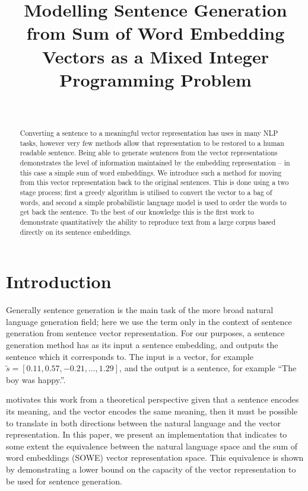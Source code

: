 \documentclass[compsoc]{IEEEtran}
\title{Modelling Sentence Generation from Sum of Word Embedding Vectors as a Mixed Integer Programming Problem}
\author{\IEEEauthorblockN{Lyndon White, Roberto Togneri, Wei Liu \and Mohammed Bennamoun}\\
	\IEEEauthorblockA{The University of Western Australia\\
		35 Stirling Highway, Crawley, Western Australia\\
		\texttt{lyndon.white@research.uwa.edu.au}\\
		\texttt{\{roberto.togneri, wei.liu, mohammed.bennamoun\}@uwa.edu.au}
		}
	}
\theoremstyle{plain}
\theoremstyle{definition}
\begin{document}
\maketitle

\begin{abstract}

	
Converting a sentence to a meaningful vector representation has uses in many NLP tasks, however very few methods allow that representation to be restored to a human readable sentence. Being able to generate sentences from the vector representations demonstrates the level of information maintained by the embedding representation -- in this case a simple sum of word embeddings. We introduce such a method for moving from this vector representation back to the original sentences. This is done using a two stage process; first a greedy algorithm is utilised to convert the vector to a bag of words, and second a simple probabilistic language model is used to order the words to get back the sentence. To the best of our knowledge this is the first work to demonstrate quantitatively the ability to reproduce text from a large corpus based directly on its sentence embeddings.
\end{abstract}

\section{Introduction} \label{intro}
Generally sentence generation is the main task of the more broad natural language generation field; here we use the term only in the context of sentence generation from sentence vector representation. For our purposes, a sentence generation method has as its input a sentence embedding, and outputs the sentence which it corresponds to. The input is a vector, for example $\tilde{s}=[0.11, 0.57,-0.21,...,1.29]$, and the output is a sentence, for example ``The boy was happy.''.

\textcite{Dinu2014CompositionalGeneration} motivates this work from a theoretical perspective given that a sentence encodes its meaning, and the vector encodes the same meaning, then it must be possible to translate in both directions between the natural language and the vector representation. In this paper, we present an implementation that indicates to some extent the equivalence between the natural language space and the sum of word embeddings (SOWE) vector representation space. This equivalence is shown by demonstrating a lower bound on the capacity of the vector representation to be used for sentence generation. 
\end{document}
